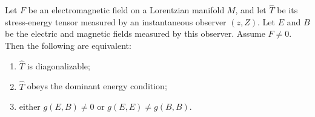Let $F$ be an electromagnetic field on a Lorentzian manifold $M$, and let $\hat{T}$ be its stress-energy tensor measured by an instantaneous observer $(z, Z)$. Let $E$ and $B$ be the electric and magnetic fields measured by this observer. Assume $F \neq 0$. Then the following are equivalent:

\begin{enumerate}
    \item $\hat{T}$ is diagonalizable;
    \item $\hat{T}$ obeys the dominant energy condition;
    \item either $g(E, B) \neq 0$ or $g(E, E) \neq g(B, B)$.
\end{enumerate}

